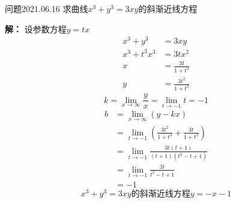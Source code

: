 \begin{mybox}{问题2021.06.16}
	\qquad 求曲线$x^3+y^3=3xy$的斜渐近线方程
\end{mybox}	
\noindent 
\textbf{解：}
设参数方程$y=tx$	
\begin{align*}
x^3+y^3&=3xy\\
x^3+t^3 x^3&=3tx^2\\
x&=\frac{3t}{1+t^3}\\
y&=\frac{3t^2}{1+t^3}
\end{align*}		
$$k=\lim\limits_{x\to \infty} \frac{y}{x}=\lim\limits_{t\to -1} t =-1$$
\begin{align*}
b&=\lim\limits_{x\to\infty} (y-kx)\\
 &=\lim\limits_{t\to -1} (\frac{3t^2}{1+t^3} +\frac{3t}{1+t^3})\\
 &=\lim\limits_{t\to -1} \frac{3t(t+1)}{(t+1)(t^2-t+1)}\\
 &=\lim\limits_{t\to -1}\frac{3t}{t^2-t+1}\\
 &=-1
\end{align*}
$$x^3+y^3=3xy\text{的斜渐近线方程} y=-x-1$$